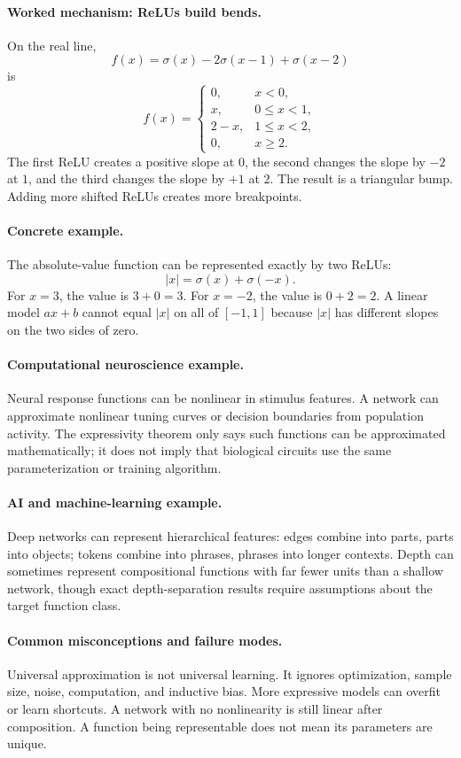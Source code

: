 \paragraph{Worked mechanism: ReLUs build bends.}
On the real line,
\[
f(x)=\sigma(x)-2\sigma(x-1)+\sigma(x-2)
\]
is
\[
f(x)=
\begin{cases}
0, & x<0,\\
x, & 0\leq x<1,\\
2-x, & 1\leq x<2,\\
0, & x\geq2.
\end{cases}
\]
The first ReLU creates a positive slope at \(0\), the second changes the slope by \(-2\) at \(1\), and the third changes the slope by \(+1\) at \(2\). The result is a triangular bump. Adding more shifted ReLUs creates more breakpoints.

\paragraph{Concrete example.}
The absolute-value function can be represented exactly by two ReLUs:
\[
|x|=\sigma(x)+\sigma(-x).
\]
For \(x=3\), the value is \(3+0=3\). For \(x=-2\), the value is \(0+2=2\). A linear model \(ax+b\) cannot equal \(|x|\) on all of \([-1,1]\) because \(|x|\) has different slopes on the two sides of zero.

\paragraph{Computational neuroscience example.}
Neural response functions can be nonlinear in stimulus features. A network can approximate nonlinear tuning curves or decision boundaries from population activity. The expressivity theorem only says such functions can be approximated mathematically; it does not imply that biological circuits use the same parameterization or training algorithm.

\paragraph{AI and machine-learning example.}
Deep networks can represent hierarchical features: edges combine into parts, parts into objects; tokens combine into phrases, phrases into longer contexts. Depth can sometimes represent compositional functions with far fewer units than a shallow network, though exact depth-separation results require assumptions about the target function class.

\paragraph{Common misconceptions and failure modes.}
Universal approximation is not universal learning. It ignores optimization, sample size, noise, computation, and inductive bias. More expressive models can overfit or learn shortcuts. A network with no nonlinearity is still linear after composition. A function being representable does not mean its parameters are unique.

